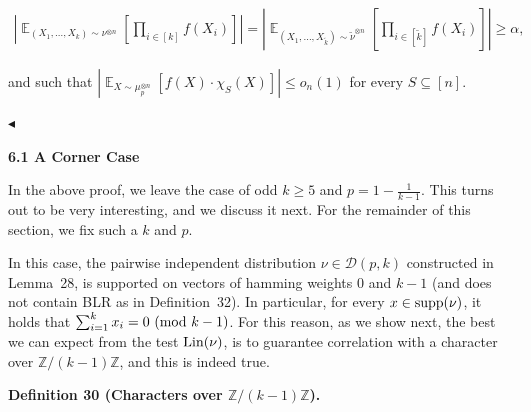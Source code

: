 \documentclass[10pt,a4paper]{article}
\begin{document}
\begin{enumerate}
\begin{enumerate}
\[\begin{gathered}
\left|\mathop{\mathbb{E}}_{(X_{1},\dots,X_{k})\sim\nu^{\otimes n}}\left[\prod_{i\in[k]}f(X_{i})\right]\right|=\left|\mathop{\mathbb{E}}_{(X_{1},\dots,X_{\tilde{k}})\sim\tilde{\nu}^{\otimes n}}\left[\prod_{i\in[\tilde{k}]}f(X_{i})\right]\right|\geqslant\alpha,
\end{gathered}\]


and such that $\left|\mathop{\mathbb{E}}_{X\sim\mu_{p}^{\otimes n}}\left[f(X)\cdot\chi_{S}(X)\right]\right|\leqslant o_{n}(1)$ for every $S\subseteq[n]$.\par





\end{enumerate}





\end{enumerate}


$\blacktriangleleft$\par





\par\medskip\noindent\textbf{
6.1 A Corner Case}\par




In the above proof, we leave the case of odd $k\geqslant 5$ and $p=1-\frac{1}{k-1}$.
This turns out to be very interesting, and we discuss it next.
For the remainder of this section, we fix such a $k$ and $p$.\par




In this case, the pairwise independent distribution $\nu\in\mathcal{D}(p,k)$ constructed in Lemma 28, is supported on vectors of hamming weights 0 and $k-1$ (and does not contain BLR as in Definition 32).
In particular, for every $x\in\textnormal{supp}(\nu)$, it holds that $\sum_{i=1}^{k}x_{i}=0\textnormal{ (mod $k-1$)}$.
For this reason, as we show next, the best we can expect from the test $\textnormal{Lin}(\nu)$, is to guarantee correlation with a character over $\mathbb{Z}/(k-1)\mathbb{Z}$, and this is indeed true.\par





\par\medskip\noindent\textbf{
\textbf{Definition 30}\textbf{ }(Characters over $\mathbb{Z}/(k-1)\mathbb{Z}$)\textbf{.}
}\par
\end{document}
